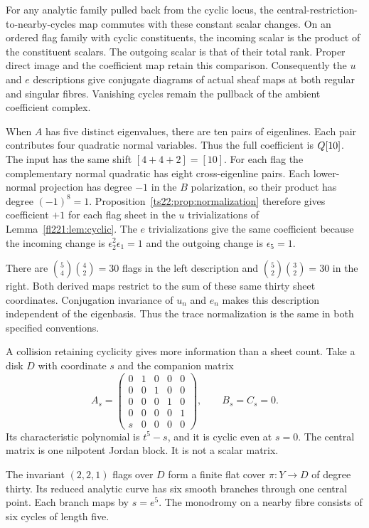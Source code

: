For any analytic family pulled back from the cyclic locus, the
central-restriction-to-nearby-cycles map commutes with these constant
scalar changes. On an ordered flag family with cyclic constituents,
the incoming scalar is the product of the constituent scalars.
The outgoing scalar is that of their total rank. Proper direct image
and the coefficient map retain this comparison. Consequently the
$u$ and $e$ descriptions give conjugate diagrams of actual sheaf maps
at both regular and singular fibres. Vanishing cycles remain the
pullback of the ambient coefficient complex.

When $A$ has five distinct eigenvalues, there are ten pairs of
eigenlines. Each pair contributes four quadratic normal variables.
Thus the full coefficient is $Q[10]$. The input has the same
shift $[4+4+2]=[10]$. For each flag the complementary normal
quadratic has eight cross-eigenline pairs. Each lower-normal
projection has degree $-1$ in the $B$ polarization, so their product
has degree $(-1)^8=1$. Proposition~\ref{ts22:prop:normalization}
therefore gives coefficient $+1$ for each flag sheet in the $u$
trivializations of Lemma~\ref{fl221:lem:cyclic}.
The $e$ trivializations give the same coefficient because the incoming
change is $\epsilon_2^2\epsilon_1=1$ and the outgoing change is
$\epsilon_5=1$.

There are $\binom54\binom42=30$ flags in the left description
and $\binom52\binom32=30$ in the right. Both derived maps restrict
to the sum of these same thirty sheet coordinates. Conjugation invariance of
$u_n$ and $e_n$ makes this description independent of the eigenbasis.
Thus the trace normalization is the same in both specified conventions.

A collision retaining cyclicity gives more information than a sheet
count. Take a disk $D$ with coordinate $s$ and the companion matrix
\[
 A_s=\begin{pmatrix}
 0&1&0&0&0\\0&0&1&0&0\\0&0&0&1&0\\0&0&0&0&1\\s&0&0&0&0
 \end{pmatrix},\qquad B_s=C_s=0.
\]
Its characteristic polynomial is $t^5-s$, and it is cyclic even
at $s=0$. The central matrix is one nilpotent Jordan block.
It is not a scalar matrix.

\begin{proposition}
\label{fl221:prop:cover}
The invariant $(2,2,1)$ flags over $D$ form a finite flat cover
$\pi:Y\to D$ of degree thirty. Its reduced analytic curve has six
smooth branches through one central point. Each branch maps by
$s=e^5$. The monodromy on a nearby fibre consists of six cycles
of length five.
\end{proposition}

